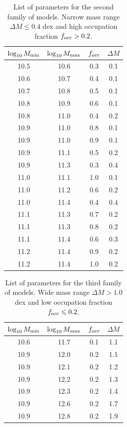 \documentclass[usenatbib]{mn2e}
\begin{document}
\begin{table}
\begin{center}
\begin{tabular}{cccc}\hline\hline
$\log_{10}M_{\rm min}$ & $\log_{10}M_{\rm max}$ & $f_{\rm occ}$ & $\Delta M$\\\hline
 10.5 &10.6 & 0.3 & 0.1 \\
 10.6 &10.7 & 0.4 & 0.1 \\
 10.7 &10.8 & 0.5 & 0.1 \\
 10.8 &10.9 & 0.6 & 0.1 \\
 10.8 &11.0 & 0.4 & 0.2 \\
 10.9 &11.0 & 0.8 & 0.1 \\
 10.9 &11.0 & 0.9 & 0.1 \\
 10.9 &11.1 & 0.5 & 0.2 \\
 10.9 &11.3 & 0.3 & 0.4 \\
 11.0 &11.1 & 1.0 & 0.1 \\
 11.0 &11.2 & 0.6 & 0.2 \\
 11.0 &11.4 & 0.4 & 0.4 \\
 11.1 &11.3 & 0.7 & 0.2 \\
 11.1 &11.3 & 0.8 & 0.2 \\
 11.1 &11.4 & 0.6 & 0.3 \\
 11.2 &11.4 & 0.9 & 0.2 \\
 11.2 &11.4 & 1.0 & 0.2 \\\hline
\end{tabular}
\end{center}
\caption{\label{table:secondfamily}List of parameters for the second
  family of models. Narrow mass range $\Delta M\leq 0.4 $ dex and high occupation fraction $f_{\rm occ}>0.2$.}
\end{table}


\begin{table}
\begin{center}
\begin{tabular}{cccc}\hline\hline
$\log_{10}M_{\rm min}$ & $\log_{10}M_{\rm max}$ & $f_{\rm occ}$ & $\Delta M$\\\hline
 10.6 &11.7 & 0.1& 1.1 \\
 10.9 &12.0 & 0.2& 1.1 \\
 10.9 &12.1 & 0.2& 1.2 \\
 10.9 &12.2 & 0.2& 1.3 \\
 10.9 &12.3 & 0.2& 1.4 \\
 10.9 &12.6 & 0.2& 1.7 \\
 10.9 &12.8 & 0.2& 1.9 \\\hline
\end{tabular}
\end{center}
\caption{\label{table:thirdfamily}List of parameters for the third
  family of models. Wide mass range $\Delta M> 1.0$ dex and low
  occupation fraction $f_{\rm occ}\leq 0.2$.} 
\end{table}
\end{document}
